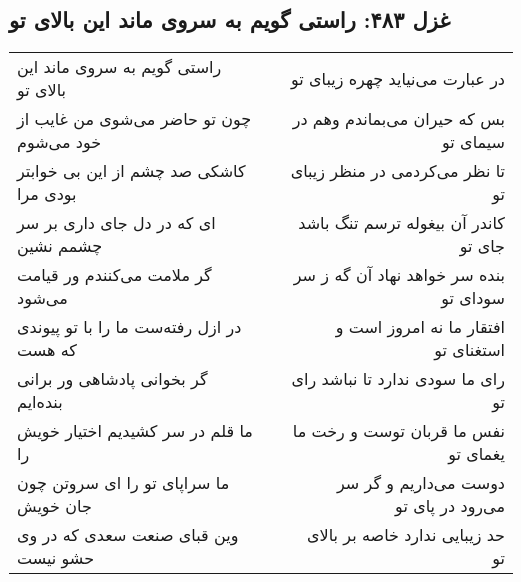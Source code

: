 \begin{center}
\section*{غزل ۴۸۳: راستی گویم به سروی ماند این بالای تو}
\label{sec:483}
\begin{longtable}{l p{0.5cm} r}
راستی گویم به سروی ماند این بالای تو
&&
در عبارت می‌نیاید چهره زیبای تو
\\
چون تو حاضر می‌شوی من غایب از خود می‌شوم
&&
بس که حیران می‌بماندم وهم در سیمای تو
\\
کاشکی صد چشم از این بی خوابتر بودی مرا
&&
تا نظر می‌کردمی در منظر زیبای تو
\\
ای که در دل جای داری بر سر چشمم نشین
&&
کاندر آن بیغوله ترسم تنگ باشد جای تو
\\
گر ملامت می‌کنندم ور قیامت می‌شود
&&
بنده سر خواهد نهاد آن گه ز سر سودای تو
\\
در ازل رفته‌ست ما را با تو پیوندی که هست
&&
افتقار ما نه امروز است و استغنای تو
\\
گر بخوانی پادشاهی ور برانی بنده‌ایم
&&
رای ما سودی ندارد تا نباشد رای تو
\\
ما قلم در سر کشیدیم اختیار خویش را
&&
نفس ما قربان توست و رخت ما یغمای تو
\\
ما سراپای تو را ای سروتن چون جان خویش
&&
دوست می‌داریم و گر سر می‌رود در پای تو
\\
وین قبای صنعت سعدی که در وی حشو نیست
&&
حد زیبایی ندارد خاصه بر بالای تو
\\
\end{longtable}
\end{center}
